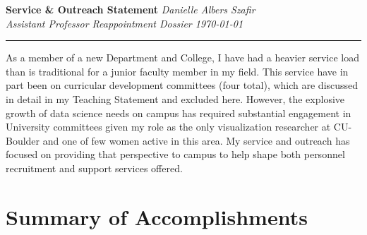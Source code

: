 \documentclass[11pt]{article}
\begin{document}
\setlength{\belowcaptionskip}{-10pt}

\thispagestyle{fancy}

\textbf{\Large Service \& Outreach Statement}
{\hspace{145pt}\emph{Danielle Albers Szafir\\Assistant Professor Reappointment Dossier \hspace{180pt}\today} \vspace{3pt}}
\hrule

As a member of a new Department and College, I have had a heavier service load than is traditional for a junior faculty member in my field. This service have in part been on curricular development committees (four total), which are discussed in detail in my Teaching Statement and excluded here. However, the explosive growth of data science needs on campus has required substantial engagement in University committees given my role as the only visualization researcher at CU-Boulder and one of few women active in this area. My service and outreach has focused on providing that perspective to campus to help shape both personnel recruitment and support services offered. 


\section*{Summary of Accomplishments}
\end{document}

